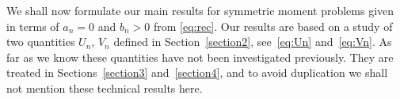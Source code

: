 We shall now formulate our main results for symmetric moment problems given in terms of $a_n=0$ and $b_n>0$ from \eqref{eq:rec}. Our results are based on a study of two quantities $U_n$, $V_n$ defined in Section~\ref{section2}, see~\eqref{eq:Un} and~\eqref{eq:Vn}. As far as we know these quantities have not been investigated previously. They are treated in Sections~\ref{section3} and~\ref{section4}, and to avoid duplication we shall not mention these technical results here.


